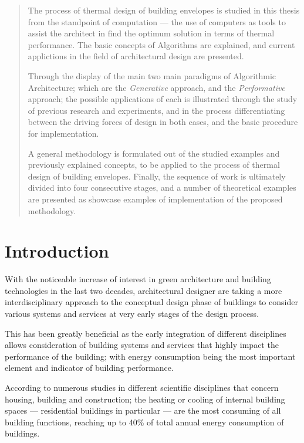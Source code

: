 \begin{abstract}
	The process of thermal design of building envelopes is studied in this thesis from the standpoint of computation --- the use of computers as tools to assist the architect in find the optimum solution in terms of thermal performance. The basic concepts of Algorithms are explained, and current applictions in the field of architectural design are presented.

	Through the display of the main two main paradigms of Algorithmic Architecture; which are the \emph{Generative} approach, and the \emph{Performative} approach; the possible applications of each is illustrated through the study of previous research and experiments, and in the process differentiating between the driving forces of design in both cases, and the basic procedure for implementation.

	A general methodology is formulated out of the studied examples and previously explained concepts, to be applied to the process of thermal design of building envelopes. Finally, the sequence of work is ultimately divided into four consecutive stages, and a number of theoretical examples are presented as showcase examples of implementation of the proposed methodology.
\end{abstract}


\cleardoublepage
\tableofcontents

\cleardoublepage
\listoffigures

\cleardoublepage
\listoftables

\cleardoublepage

\chapter{Introduction}

With the noticeable increase of interest in green architecture and building technologies in the last two decades, architectural designer are taking a more interdisciplinary approach to the conceptual design phase of buildings to consider various systems and services at very early stages of the design process.

This has been greatly beneficial as the early integration of different disciplines allows consideration of building systems and services that highly impact the performance of the building; with energy consumption being the most important element and indicator of building performance.

According to numerous studies in different scientific disciplines that concern housing, building and construction; the heating or cooling of internal building spaces --- residential buildings in particular --- are the most consuming of all building functions, reaching up to 40\% of total annual energy consumption of buildings.

